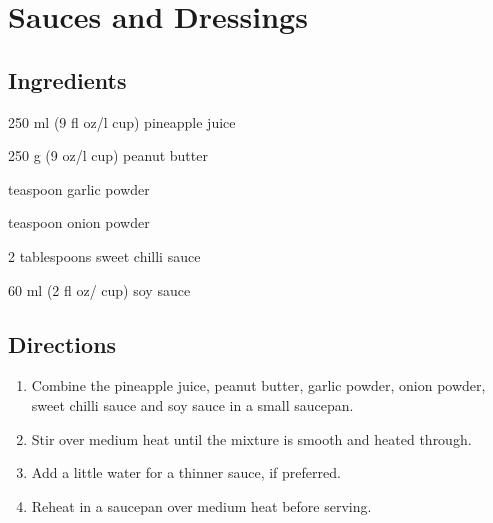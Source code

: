 \chapter{Sauces and Dressings}






\section*{Ingredients}
\begin{ingredients-list}
	\item 250 ml (9 fl oz/l cup) pineapple juice
	\item 250 g (9 oz/l cup) peanut butter
	\item {} teaspoon garlic powder
	\item {} teaspoon onion powder
	\item 2 tablespoons sweet chilli sauce
	\item 60 ml (2 fl oz/  cup) soy sauce
\end{ingredients-list}

\section*{Directions}
\begin{enumerate}
	\item Combine the pineapple juice, peanut butter, garlic powder, onion powder, sweet chilli sauce and soy sauce in a small saucepan.
	\item Stir over medium heat until the mixture is smooth and heated through.
	\item Add a little water for a thinner sauce, if preferred.
	\item Reheat in a saucepan over medium heat before serving.
\end{enumerate}


